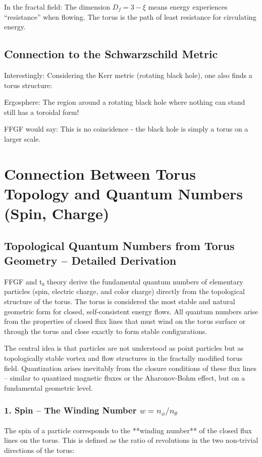 \documentclass[12pt,a4paper]{article}
\begin{document}
In the fractal field:
The dimension \( D_f = 3 - \xi \) means energy experiences ``resistance'' when flowing. The torus is the path of least resistance for circulating energy.

\subsection{Connection to the Schwarzschild Metric}
Interestingly: Considering the Kerr metric (rotating black hole), one also finds a torus structure:

Ergosphere: The region around a rotating black hole where nothing can stand still has a toroidal form!

FFGF would say: This is no coincidence - the black hole is simply a torus on a larger scale.

\section{Connection Between Torus Topology and Quantum Numbers (Spin, Charge)}

\subsection{Topological Quantum Numbers from Torus Geometry – Detailed Derivation}

FFGF and t₀ theory derive the fundamental quantum numbers of elementary particles (spin, electric charge, and color charge) directly from the topological structure of the torus. The torus is considered the most stable and natural geometric form for closed, self-consistent energy flows. All quantum numbers arise from the properties of closed flux lines that must wind on the torus surface or through the torus and close exactly to form stable configurations.

The central idea is that particles are not understood as point particles but as topologically stable vortex and flow structures in the fractally modified torus field. Quantization arises inevitably from the closure conditions of these flux lines – similar to quantized magnetic fluxes or the Aharonov-Bohm effect, but on a fundamental geometric level.

\subsubsection{1. Spin – The Winding Number $w = n_\phi / n_\theta$}

The spin of a particle corresponds to the **winding number** of the closed flux lines on the torus. This is defined as the ratio of revolutions in the two non-trivial directions of the torus:
\end{document}
